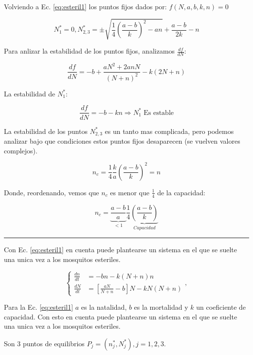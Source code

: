 \documentclass[twocolumn,aps,prl]{revtex4-1}
\newcommand{\nstar}{n^*}
\newcommand{\Nstar}{N^*}
\newcommand*\sepline{%
  \begin{center}
    \rule[1ex]{.5\textwidth}{.5pt}
  \end{center}}
\begin{document}
Volviendo a Ec. \ref{eq:esteril1} los puntos fijos dados por: $f(N,a,b,k,n) = 0$


$$
\Nstar_1 = 0, 
\Nstar_{2,3} = \pm 
\sqrt{
    \frac{1}{4} \left( \frac{a-b}{k} \right)^2 - a n 
    }
+ \frac{a-b}{2k} 
- n
$$

Para anlizar la estabilidad de los puntos fijos, analizamos $\frac{d f}{d N}$:

$$
\frac{d f}{d N} = - b + \frac{ aN^2 + 2 a n N}{( N + n )^2}
- k (2N + n)
$$

La estabilidad de $\Nstar_1$:

$$
\frac{d f}{d N} = - b - k  n \Rightarrow  \Nstar_1 \text{ Es estable}
$$

La estabilidad de los puntos $\Nstar_{2,3}$ es un tanto mas complicada, pero podemos analizar bajo que condiciones estos puntos fijos desaparecen (se vuelven valores complejos).

$$
n_c =  
\frac{1}{4} 
\frac{k}{a} 
\left( \frac{a-b}{k} \right)^2 = n 
$$

Donde, reordenando, vemos que $n_c$ es menor que $ \frac{1}{4} $ de la capacidad:

$$
n_c =  
\underbrace{\frac{a-b}{a} }_{<1}
\frac{1}{4} 
\underbrace{\left( \frac{a-b}{k} \right)}_{Capacidad }
$$

\sepline

Con Ec. \ref{eq:esteril1} en cuenta puede plantearse un sistema en el que se suelte una unica vez a los mosquitos esteriles.

\begin{equation}
    \left\lbrace
    \begin{aligned}
        \frac{d n}{d t}&=  -b n - k (N+n) n \\
        \frac{d N}{d t}&=\left[\frac{a N}{N+n}-b\right] N- k N(N+n)
    \end{aligned}
    \right. ,
\end{equation}

Para la Ec. \ref{eq:esteril1}  $a$ es la natalidad, $b$ es la mortalidad y $k$ un coeficiente de capacidad. Con esto en cuenta puede plantearse un sistema en el que se suelte una unica vez a los mosquitos esteriles.

Son 3 puntos de equilibrios $P_j = (\nstar_{j},\Nstar_{j}), j= 1, 2, 3$.
\end{document}

